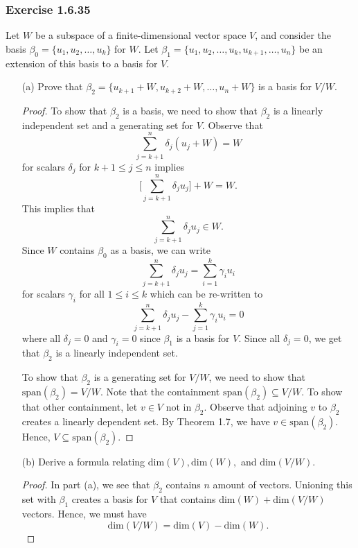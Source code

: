 \subsubsection{Exercise 1.6.35} Let \( W  \) be a subspace of a finite-dimensional vector space \( V  \), and consider the basis \( \beta_{0} =  \{ u_{1}, u_{2}, \dots, u_{k } \}   \) for \( W  \). Let \( \beta_{1} = \{ u_{1}, u_{2}, \dots, u_{k }, u_{k+1}, \dots, u_{n} \}  \) be an extension of this basis to a basis for \( V  \).
\begin{enumerate}
    \item[(a)] Prove that \( \beta_{2} = \{ u_{k+1} + W , u_{k+2} + W, \dots, u_{n} + W  \}  \) is a basis for \( V / W  \).
        \begin{proof}
            To show that \( \beta_{2}  \) is a basis, we need to show that \( \beta_{2} \) is a linearly independent set and a generating set for \( V  \). Observe that 
            \[  \sum_{ j=k+1 }^{ n } \delta_{j} (u_{j} + W) = W  \] 
             for scalars \( \delta_{j}  \) for \( k+1 \leq j \leq n  \) implies 
            \[ \Big[\sum_{ j=k+1 }^{ n  } \delta_{j} u_{j}  \Big] + W = W.      \]
            This implies that 
            \[  \sum_{ j=k+1 }^{ n } \delta_{j} u_{j} \in W. \tag{1}  \]
            Since \( W  \) contains \( \beta_{0}  \) as a basis, we can write
            \[  \sum_{ j=k+1 }^{ n } \delta_{j} u_{j} = \sum_{ i=1 }^{ k }\gamma_{i} u_{i} \]
            for scalars \( \gamma_{i}  \) for all \( 1 \leq i \leq k  \) which can be re-written to 
            \[ \sum_{ j=k+1 }^{ n } \delta_{j} u_{j} - \sum_{ j=1 }^{ k  }\gamma_{i} u_{i} = 0  \]
            where all \( \delta_{j} = 0  \) and \( \gamma_{i} = 0  \) since \( \beta_{1} \) is a basis for \( V  \). Since all \( \delta_{j} = 0 \), we get that \( \beta_{2}  \) is a linearly independent set. 

            To show that \( \beta_{2}  \) is a generating set for \( V / W  \), we need to show that \( \text{span}(\beta_{2}) = V / W  \). Note that the containment \( \text{span}(\beta_{2}) \subseteq V / W  \). To show that other containment, let \( v \in V  \) not in \( \beta_{2} \). Observe that adjoining \( v  \) to \( \beta_{2} \) creates a linearly dependent set. By Theorem 1.7, we have \( v \in \text{span}(\beta_{2}) \). Hence, \( V \subseteq \text{span}(\beta_{2}) \). 

        \end{proof}
    \item[(b)] Derive a formula relating \( \text{dim}(V), \text{dim}(W),  \) and \( \text{dim}(V / W ) \).
        \begin{proof}
            In part (a), we see that \( \beta_{2} \) contains \( n \) amount of vectors. Unioning this set with \( \beta_{1}   \) creates a basis for \( V  \) that contains \( \text{dim}(W) + \text{dim}(V/W) \) vectors. Hence, we must have 
            \[  \text{dim}(V/W) = \text{dim}(V) - \text{dim}(W). \]
        \end{proof}
\end{enumerate}

